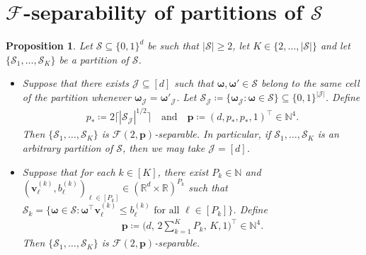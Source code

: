 \documentclass[12pt]{article}
\newtheorem{prop}[thm]{Proposition}
\begin{document}
\section{\texorpdfstring{$\mathcal{F}$-separability of partitions of $\mathcal{S}$}{F-separability of partitions of S}}

\begin{prop} \label{prop:F(L,p,s)-separable}
    Let $\mathcal{S} \subseteq \{0,1\}^d$ be such that $|\mathcal{S}| \geq 2$, let $K\in\{2,\ldots,|\mathcal{S}|\}$ and let $\{\mathcal{S}_1, \ldots, \mathcal{S}_K\}$ be a partition of $\mathcal{S}$.
    \begin{itemize}
        \item[(a)] Suppose that there exists $\mathcal{J} \subseteq [d]$ such that $\bm\omega, \bm\omega' \in \mathcal{S}$ belong to the same cell of the partition whenever $\bm\omega_{\mathcal{J}} = \bm\omega'_{\mathcal{J}}$. Let $\mathcal{S}_{\mathcal{J}} \coloneqq \{\bm\omega_{\mathcal{J}} : \bm\omega \in \mathcal{S}\} \subseteq \{0,1\}^{|\mathcal{J}|}$. Define 
        \begin{gather*}
            p_* \coloneqq 2\bigl\lceil |\mathcal{S}_{\mathcal{J}}|^{1/2} \bigr\rceil \quad\text{and}\quad
            \bm p \coloneqq (d,p_*,p_*,1)^\top \in \mathbb{N}^{4}.
        \end{gather*}
        Then $\{\mathcal{S}_1,\ldots,\mathcal{S}_K\}$ is $\mathcal{F}(2,\bm p)$-separable. In particular, if $\mathcal{S}_1,\ldots,\mathcal{S}_K$ is an arbitrary partition of $\mathcal{S}$, then we may take $\mathcal{J} = [d]$.

        \item[(b)] Suppose that for each $k\in[K]$, there exist $P_k \in \mathbb{N}$ and $(\bm v^{(k)}_{\ell}, b^{(k)}_{\ell})_{\ell \in [P_k]} \in (\mathbb{R}^d \times \mathbb{R})^{P_k}$ such that $\mathcal{S}_k = \bigl\{\bm\omega\in\mathcal{S}:\bm\omega^\top \bm v^{(k)}_{\ell} \leq b^{(k)}_{\ell} \text{ for all } \ell\in[P_k]\bigr\}$. Define
        \begin{gather*}
            \bm p \coloneqq \biggl(d,\, 2\sum_{k=1}^K P_k,\, K, 1\biggr)^\top \in \mathbb{N}^4.
        \end{gather*}
        Then $\{\mathcal{S}_1,\ldots,\mathcal{S}_K\}$ is $\mathcal{F}(2,\bm p)$-separable.
    \end{itemize}
\end{prop}
\end{document}
